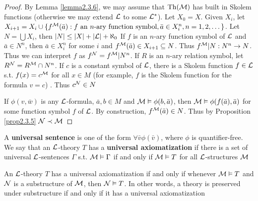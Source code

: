 \documentclass[11pt]{article}
\begin{document}
\begin{proof}
By Lemma \ref{lemma2.3.6}, we may assume that \(\operatorname{Th}(\mathcal{M})\) has built in
Skolem functions (otherwise we may extend \(\mathcal{L}\) to some \(\mathcal{L}^*\)). Let
\(X_0=X\). Given \(X_i\), let \(X_{i+1}=X_i\cup\{f^{\mathcal{M}}(\bar{a}):f\text{ an
   }n\text{-ary function symbol},\bar{a}\in X^n_i,n=1,2,\dots\}\). Let
\(N=\bigcup X_i\), then \(\abs{N}\le\abs{X}+\abs{\call}+\aleph_0\)
If \(f\) is an \(n\)-ary function symbol of \(\mathcal{L}\) and \(\bar{a}\in N^n\),
then \(\bar{a}\in X^n_i\) for some \(i\) and 
\(f^{\mathcal{M}}(\bar{a})\in X_{i+1}\subseteq N\). Thus \(f^{\mathcal{M}}|N:N^n\to N\). Thus
we can interpret \(f\) as \(f^{\mathcal{N}}=f^{\mathcal{M}}|N^n\). If \(R\) is an \(n\)-ary
relation symbol, let \(R^{\mathcal{N}}=R^{\mathcal{M}}\cap N^n\). If \(c\) is a constant
symbol of \(\mathcal{L}\), there is a Skolem function \(f\in\mathcal{L}\) s.t. 
\(f(x)=c^{\mathcal{M}}\) for all \(x\in M\) (for example, \(f\) is the Skolem
function for the formula \(v=c\)) . Thus \(c^{\mathcal{N}}\in N\)

If \(\phi(v,\bar{w})\) is any \(\mathcal{L}\)-formula, \(\bar{a},b\in M\) and
\(\mathcal{M}\vDash\phi(b,\bar{a})\), then
\(\mathcal{M}\vDash\phi(f(\bar{a}),\bar{a})\) for some function symbol \(f\) of
\(\mathcal{L}\). By construction, \(f^{\mathcal{M}}(\bar{a})\in N\). Thus by Proposition
\ref{prop2.3.5} \(\mathcal{N}\prec\mathcal{M}\)
\end{proof}

\begin{definition}[]
A \textbf{universal sentence} is one of the form \(\forall\bar{v}\phi(\bar{v})\), where
\(\phi\) is quantifier-free. We say that an \(\mathcal{L}\)-theory \(T\) has a \textbf{universal
axiomatization} if there is a set of universal \(\mathcal{L}\)-sentences \(\Gamma\) s.t. 
\(\mathcal{M}\vDash\Gamma\) if and only if \(\mathcal{M}\vDash T\) for all
\(\mathcal{L}\)-structures \(\mathcal{M}\)
\end{definition}

\begin{theorem}[]
An \(\mathcal{L}\)-theory \(T\) has a universal axiomatization if and only if
whenever \(\mathcal{M}\vDash T\) and \(\mathcal{N}\) is a substructure of \(\mathcal{M}\),
then \(\mathcal{N}\vDash T\). In other words, a theory is preserved under
substructure if and only if it has a universal axiomatization
\end{theorem}
\end{document}
